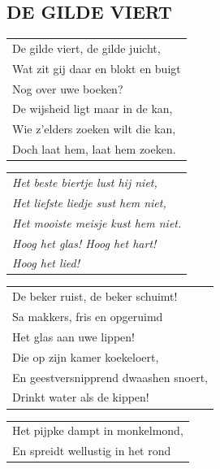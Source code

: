 \documentclass[a4paper, 14pt]{extarticle}
\begin{document}
\subsection*{DE GILDE VIERT}
\begin{flushleft}
\begin{tabularx}{0.8\textwidth} {
   >{\raggedright\arraybackslash}X}
   De gilde viert, de gilde juicht,\\
Wat zit gij daar en blokt en buigt\\
Nog over uwe boeken?\\
De wijsheid ligt maar in de kan,\\
Wie z’elders zoeken wilt die kan,\\
Doch laat hem, laat hem zoeken.\\
\end{tabularx}
\end{flushleft}\begin{flushleft}
\begin{tabularx}{0.8\textwidth} {
   >{\raggedright\arraybackslash}X}
   \textit{Het beste biertje lust hij niet,}\\
\textit{Het liefste liedje sust hem niet,}\\
\textit{Het mooiste meisje kust hem niet.}\\
\textit{Hoog het glas! Hoog het hart!}\\
\textit{Hoog het lied!}\\
\end{tabularx}
\end{flushleft}\begin{flushleft}
\begin{tabularx}{0.8\textwidth} {
   >{\raggedright\arraybackslash}X}
De beker ruist, de beker schuimt!\\
Sa makkers, fris en opgeruimd\\
Het glas aan uwe lippen!\\
Die op zijn kamer koekeloert,\\
En geestversnipprend dwaashen snoert,\\
Drinkt water als de kippen!\\
\end{tabularx}
\end{flushleft}\begin{flushleft}
\begin{tabularx}{0.8\textwidth} {
   >{\raggedright\arraybackslash}X}
Het pijpke dampt in monkelmond,\\
En spreidt wellustig in het rond\\

\end{tabularx}
\end{flushleft}
\end{document}
